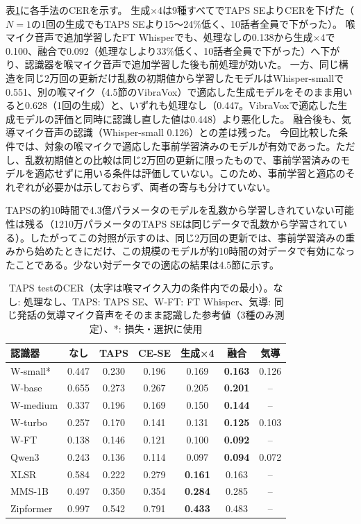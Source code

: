 \documentclass[xelatex,ja=standard,a4paper,twocolumn,10pt]{bxjsarticle}
\makeatletter
\renewcommand{\subsection}{\@startsection{subsection}{2}{\z@}{.7ex plus .2ex}{.3ex}{\normalfont\normalsize\sffamily\bfseries}}
\makeatother
\begin{document}
\subsection{前処理が効く条件}
表\ref{tab:main}に各手法のCERを示す。
生成×4は9種すべてでTAPS SEよりCERを下げた（$N=1$の1回の生成でもTAPS SEより15〜24\%低く、10話者全員で下がった）。
喉マイク音声で追加学習したFT Whisperでも、処理なしの0.138から生成×4で0.100、融合で0.092（処理なしより33\%低く、10話者全員で下がった）へ下がり、認識器を喉マイク音声で追加学習した後も前処理が効いた。
一方、同じ構造を同じ2万回の更新だけ乱数の初期値から学習したモデルはWhisper-smallで0.551、別の喉マイク（4.5節のVibraVox）で適応した生成モデルをそのまま用いると0.628（1回の生成）と、いずれも処理なし（0.447。VibraVoxで適応した生成モデルの評価と同時に認識し直した値は0.448）より悪化した。
融合後も、気導マイク音声の認識（Whisper-small 0.126）との差は残った。
今回比較した条件では、対象の喉マイクで適応した事前学習済みのモデルが有効であった。ただし、乱数初期値との比較は同じ2万回の更新に限ったもので、事前学習済みのモデルを適応せずに用いる条件は評価していない。このため、事前学習と適応のそれぞれが必要かは示しておらず、両者の寄与も分けていない。

TAPSの約10時間で4.3億パラメータのモデルを乱数から学習しきれていない可能性は残る（1210万パラメータのTAPS SEは同じデータで乱数から学習されている）。したがってこの対照が示すのは、同じ2万回の更新では、事前学習済みの重みから始めたときにだけ、この規模のモデルが約10時間の対データで有効になったことである。少ない対データでの適応の結果は4.5節に示す。

\begin{table}[t]
  \centering
  \caption{TAPS testのCER（太字は喉マイク入力の条件内での最小）。なし: 処理なし、TAPS: TAPS SE、W-FT: FT Whisper、気導: 同じ発話の気導マイク音声をそのまま認識した参考値（3種のみ測定）、*: 損失・選択に使用}
  \label{tab:main}
  \footnotesize
  \setlength{\tabcolsep}{3.0pt}
  \begin{tabular}{lcccccc}
    \toprule
    認識器 & なし & TAPS & CE-SE & 生成×4 & 融合 & 気導 \\
    \midrule
    W-small* & 0.447 & 0.230 & 0.196 & 0.169 & \textbf{0.163} & 0.126 \\
    W-base & 0.655 & 0.273 & 0.267 & 0.205 & \textbf{0.201} & -- \\
    W-medium & 0.337 & 0.196 & 0.169 & 0.150 & \textbf{0.144} & -- \\
    W-turbo & 0.257 & 0.170 & 0.141 & 0.131 & \textbf{0.125} & 0.103 \\
    W-FT & 0.138 & 0.146 & 0.121 & 0.100 & \textbf{0.092} & -- \\
    Qwen3 & 0.243 & 0.136 & 0.114 & 0.097 & \textbf{0.094} & 0.072 \\
    \midrule
    XLSR & 0.584 & 0.222 & 0.279 & \textbf{0.161} & 0.163 & -- \\
    MMS-1B & 0.497 & 0.350 & 0.354 & \textbf{0.284} & 0.285 & -- \\
    Zipformer & 0.997 & 0.542 & 0.791 & \textbf{0.433} & 0.483 & -- \\
    \bottomrule
  \end{tabular}
\end{table}
\end{document}
